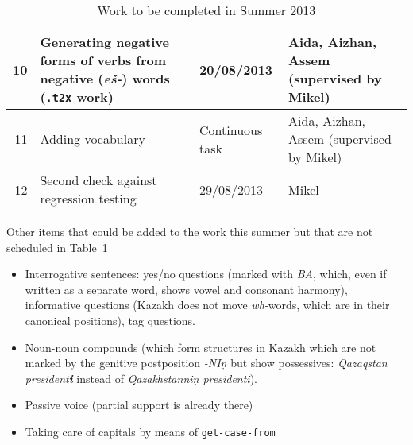 \documentclass{article}
\begin{document}
\begin{table}
\begin{tabular}{r|p{7.5cm}|p{1.7cm}|p{2.2cm}}
    10  & Generating negative forms of verbs from negative (\emph{e\v{s}-}) words (\texttt{.t2x} work) & 20/08/2013 & Aida, Aizhan, Assem (supervised by Mikel) \\\hline
   11  & Adding vocabulary & Continuous task & Aida, Aizhan, Assem (supervised by Mikel) \\\hline
   12 & Second check against regression testing & 29/08/2013 & Mikel \\\hline
  \end{tabular}
  \caption{Work to be completed in Summer 2013}
  \label{tb:todo}
\end{table}

Other items that could be added to the work this summer but that are not scheduled in Table~\ref{tb:todo}
\begin{itemize}
\item Interrogative sentences: yes/no questions (marked with \emph{BA}, which, even if written as a separate word, shows vowel and consonant harmony), informative questions (Kazakh does not move \emph{wh-}words, which are in their canonical positions), tag questions.
\item Noun-noun compounds (which form structures in Kazakh which are not marked by the genitive postposition \emph{-NI\c{n}} but show possessives: \emph{Qazaqstan president\textbf{i}} instead of \emph{Qazakhstanni\c{n} presidenti}).
\item Passive voice (partial support is already there)
\item Taking care of capitals by means of \texttt{get-case-from} 
\end{itemize}
\end{document}
